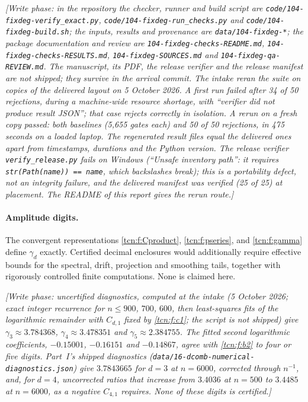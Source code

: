 \documentclass[11pt,letterpaper]{article}
\theoremstyle{remark}
\begin{document}
\emph{[Write phase: in the repository the checker, runner and build script are \textup{\nolinkurl{code/104-fixdeg-verify_exact.py}}, \textup{\nolinkurl{code/104-fixdeg-run_checks.py}} and \textup{\nolinkurl{code/104-fixdeg-build.sh}}; the inputs, results and provenance are \textup{\nolinkurl{data/104-fixdeg-*}}; the package documentation and review are \textup{\nolinkurl{104-fixdeg-checks-README.md}}, \textup{\nolinkurl{104-fixdeg-checks-RESULTS.md}}, \textup{\nolinkurl{104-fixdeg-SOURCES.md}} and \textup{\nolinkurl{104-fixdeg-qa-REVIEW.md}}. The manuscript, its PDF, the release verifier and the release manifest are not shipped; they survive in the arrival commit. The intake reran the suite on copies of the delivered layout on 5 October 2026. A first run failed after 34 of 50 rejections, during a machine-wide resource shortage, with ``verifier did not produce result JSON''; that case rejects correctly in isolation. A rerun on a fresh copy passed: both baselines (5,655 gates each) and 50 of 50 rejections, in 475 seconds on a loaded laptop. The regenerated result files equal the delivered ones apart from timestamps, durations and the Python version. The release verifier \textup{\nolinkurl{verify_release.py}} fails on Windows (``Unsafe inventory path'': it requires \texttt{str(Path(name)) == name}, which backslashes break); this is a portability defect, not an integrity failure, and the delivered manifest was verified (25 of 25) at placement. The README of this report gives the rerun route.]}

\paragraph{Amplitude digits.}
The convergent representations \eqref{tcn:f:Cproduct}, \eqref{tcn:f:pseries}, and \eqref{tcn:f:gamma} define $\gamma_d$ exactly. Certified decimal enclosures would additionally require effective bounds for the spectral, drift, projection and smoothing tails, together with rigorously controlled finite computations. None is claimed here.

\emph{[Write phase: uncertified diagnostics, computed at the intake (5 October 2026; exact integer recurrence for $n\le900$, $700$, $600$, then least-squares fits of the logarithmic remainder with $C_{d,1}$ fixed by \eqref{tcn:f:c1}; the script is not shipped) give $\gamma_3\approx3.784368$, $\gamma_4\approx3.478351$ and $\gamma_5\approx2.384755$. The fitted second logarithmic coefficients, $-0.15001$, $-0.16151$ and $-0.14867$, agree with \eqref{tcn:f:b2} to four or five digits. Part~I's shipped diagnostics (\textup{\nolinkurl{data/16-dcomb-numerical-diagnostics.json}}) give $3.7843665$ for $d=3$ at $n=6000$, corrected through $n^{-1}$, and, for $d=4$, uncorrected ratios that \emph{increase} from $3.4036$ at $n=500$ to $3.4485$ at $n=6000$, as a negative $C_{4,1}$ requires. None of these digits is certified.]}
\end{document}
